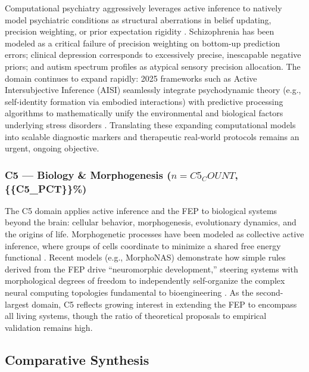 \documentclass[
]{article}
\begin{document}
Computational psychiatry aggressively leverages active inference to
natively model psychiatric conditions as structural aberrations in
belief updating, precision weighting, or prior expectation rigidity
\citep{smith2021computational}. Schizophrenia has been modeled as a
critical failure of precision weighting on bottom-up prediction errors;
clinical depression corresponds to excessively precise, inescapable
negative priors; and autism spectrum profiles as atypical sensory
precision allocation. The domain continues to expand rapidly: 2025
frameworks such as Active Intersubjective Inference (AISI) seamlessly
integrate psychodynamic theory (e.g., self-identity formation via
embodied interactions) with predictive processing algorithms to
mathematically unify the environmental and biological factors underlying
stress disorders \citep{smith2025active}. Translating these expanding
computational models into scalable diagnostic markers and therapeutic
real-world protocols remains an urgent, ongoing objective.

\subsubsection{\texorpdfstring{C5 --- Biology \& Morphogenesis
(\(n = {{C5_COUNT}}\),
\{\{C5\_PCT\}\}\%)}{C5 --- Biology \& Morphogenesis (n = \{\{C5\_COUNT\}\}, \{\{C5\_PCT\}\}\%)}}\label{c5-biology-morphogenesis-n-c5_count-c5_pct}

The C5 domain applies active inference and the FEP to biological systems
beyond the brain: cellular behavior, morphogenesis, evolutionary
dynamics, and the origins of life. Morphogenetic processes have been
modeled as collective active inference, where groups of cells coordinate
to minimize a shared free energy functional
\citep{kuchling2020morphogenesis, levin2022technological}. Recent models
(e.g., MorphoNAS) demonstrate how simple rules derived from the FEP
drive ``neuromorphic development,'' steering systems with morphological
degrees of freedom to independently self-organize the complex neural
computing topologies fundamental to bioengineering
\citep{levin2025morphonas}. As the second-largest domain, C5 reflects
growing interest in extending the FEP to encompass all living systems,
though the ratio of theoretical proposals to empirical validation
remains high.

\subsection{Comparative Synthesis}\label{comparative-synthesis}
\end{document}

